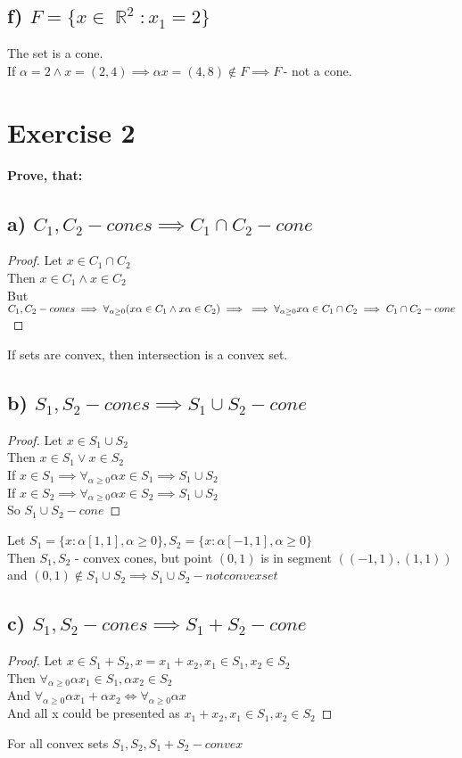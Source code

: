 \documentclass[12pt]{article}
\DeclareMathOperator{\R}{\mathbb{R}}
\begin{document}
\subsection*{f) \(F=\{x \in \R^2 : x_1=2\}\) }
The set is a cone.\\
If \(\alpha = 2 \land x = (2,4) \implies \alpha x=(4, 8) \notin F\implies F\,\)- not a cone.
\section*{Exercise 2}
{\bfseries Prove, that:}
\subsection*{a) \( C_1, C_2 - cones \implies C_1 \cap C_2 - cone\)}
\begin{proof}
    Let \( x \in C_1 \cap C_2\)\\
    Then \( x \in C_1 \land x \in C_2 \) \\
    But \( C_1, C_2 - cones \implies \forall_{\alpha \geq 0} (x \alpha \in C_1 \land x \alpha \in C_2) \implies \\ \implies \forall_{\alpha \geq 0} x\alpha \in C_1 \cap C_2 \implies C_1 \cap C_2 - cone\) 
\end{proof}
If sets are convex, then intersection is a convex set.
\subsection*{b) \(S_1, S_2 - cones \implies S_1 \cup S_2 - cone\) }
\begin{proof}
    Let \( x \in S_1 \cup S_2\)\\
    Then \( x \in S_1 \lor x \in S_2 \)\\
    If \( x \in S_1 \implies \forall_{\alpha \geq 0} \alpha x \in S_1 \implies S_1 \cup S_2\)\\
    If \( x \in S_2 \implies \forall_{\alpha \geq 0} \alpha x \in S_2 \implies S_1 \cup S_2\)\\
    So \( S_1 \cup S_2 - cone\)
\end{proof}
Let \( S_1 = \{x: \alpha[1,1], \alpha \geq 0\}, S_2 = \{x: \alpha[-1,1], \alpha \geq 0\} \)\\
Then \( S_1, S_2\) - convex cones, but point \((0, 1)\) is in segment \( ((-1, 1), (1,1)) \) and \( (0,1) \notin S_1 \cup S_2 \implies S_1 \cup S_2 - not convex set \)
\subsection*{c) \( S_1, S_2 -cones \implies S_1+S_2 -cone\)}
\begin{proof}
Let \(x \in S_1 +S_2, x=x_1+x_2, x_1 \in S_1, x_2 \in S_2\)\\
Then \( \forall_{\alpha \geq 0} \alpha x_1 \in S_1, \alpha x_2 \in S_2  \)\\
And \( \forall_{\alpha \geq 0} \alpha x_1+\alpha x_2 \iff \forall_{\alpha \geq 0} \alpha x\)\\
And all x could be presented as \( x_1+x_2, x_1 \in S_1, x_2 \in S_2\)
\end{proof}
For all convex sets \(S_1, S_2, S_1+S_2 -convex\)
\end{document}
